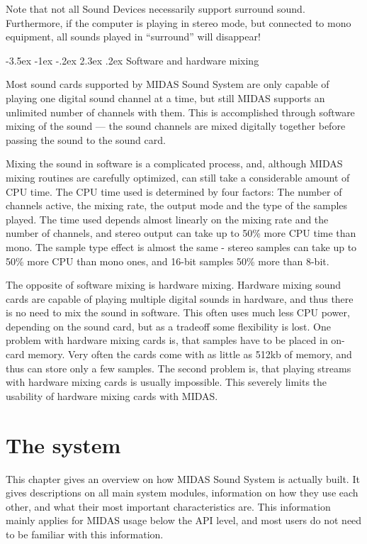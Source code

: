 \documentclass[a4paper,12pt,oneside]{book}
\makeatletter
\renewcommand\section{\@startsection {section}{1}{-20pt}%
                                   {-3.5ex \@plus -1ex \@minus -.2ex}%
                                   {2.3ex \@plus.2ex}%
                                   {\normalfont\Large\bfseries}}
\makeatother
\begin{document}
Note that not all Sound Devices necessarily support surround sound.
Furthermore, if the computer is playing in stereo mode, but connected to mono
equipment, all sounds played in ``surround'' will disappear!


\section{Software and hardware mixing}

Most sound cards supported by MIDAS Sound System are only capable of playing
one digital sound channel at a time, but still MIDAS supports an unlimited
number of channels with them. This is accomplished through software mixing of
the sound --- the sound channels are mixed digitally together before passing
the sound to the sound card.

Mixing the sound in software is a complicated process, and, although MIDAS
mixing routines are carefully optimized, can still take a considerable amount
of CPU time. The CPU time used is determined by four factors: The number of
channels active, the mixing rate, the output mode and the type of the samples
played. The time used depends almost linearly on the mixing rate and the
number of channels, and stereo output can take up to 50\%{} more CPU time
than mono. The sample type effect is almost the same - stereo samples can
take up to 50\%{} more CPU than mono ones, and 16-bit samples 50\%{} more
than 8-bit.

The opposite of software mixing is hardware mixing. Hardware mixing sound
cards are capable of playing multiple digital sounds in hardware, and thus
there is no need to mix the sound in software. This often uses much less CPU
power, depending on the sound card, but as a tradeoff some flexibility is
lost. One problem with hardware mixing cards is, that samples have to be
placed in on-card memory. Very often the cards come with as little as 512kb
of memory, and thus can store only a few samples. The second problem is, that
playing streams with hardware mixing cards is usually impossible. This
severely limits the usability of hardware mixing cards with MIDAS.







\chapter{The system}

This chapter gives an overview on how MIDAS Sound System is actually built.
It gives descriptions on all main system modules, information on how they use
each other, and what their most important characteristics are. This
information mainly applies for MIDAS usage below the API level, and most
users do not need to be familiar with this information.
\end{document}
